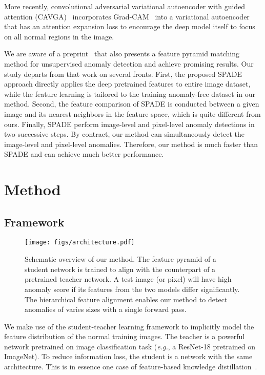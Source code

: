 \documentclass[final]{cvpr}
\begin{document}
{More recently, convolutional adversarial variational autoencoder with guided attention (CAVGA)~\cite{Venkataramanan2019} incorporates Grad-CAM~\cite{Selvaraju2017} into a variational autoencoder that has an attention expansion loss to encourage the deep model itself to focus on all normal regions in the image.


We are aware of a preprint~\cite{Cohen2020} that also presents a feature pyramid matching method for unsupervised anomaly detection and achieve promising results. Our study departs from that work on several fronts. First, the proposed SPADE approach directly applies the deep pretrained features to entire image dataset, while the feature learning is tailored to the training anomaly-free dataset in our method. Second, the feature comparison of SPADE is conducted between a given image and its  nearest neighbors in the feature space, which is quite different from ours. Finally, SPADE perform image-level and pixel-level anomaly detections in two successive steps. By contract, our method can simultaneously detect the image-level and pixel-level anomalies. Therefore, our method is much faster than SPADE and can achieve much better performance.


\section{Method}
\label{sec3}



\subsection{Framework}


\begin{figure*}[!t]
	\centering
	\texttt{[image: figs/architecture.pdf]}
	\caption{Schematic overview of our method. The feature pyramid of a student network is trained to align with the counterpart of a pretrained teacher network. A test image (or pixel) will have high anomaly score if its features from the two models differ significantly. The hierarchical feature alignment enables our method to detect anomalies of varies sizes with a single forward pass.}
	\label{fig2}
\end{figure*}

We make use of the student-teacher learning framework to implicitly model the feature distribution of the normal training images. The teacher is a powerful network pretrained on image classification task (\textit{e.g.}, a ResNet-18 pretrained on ImageNet). To reduce information loss, the student is a network with the same architecture. This is in essence one case of feature-based knowledge distillation~\cite{Wang2020}.

}
\end{document}
